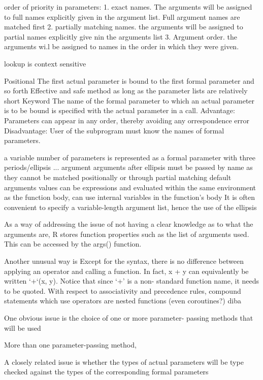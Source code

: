 \documentclass[12pt]{article}
\begin{document}
order of priority in parameters:
1. exact names. The arguments will be assigned to full names explicitly given in the argument list. Full argument names are matched first
2. partially matching names. the arguments will be assigned to partial names explicitly give nin the arguments list
3. Argument order. the arguments wi.l be assigned to names in the order in which they were given.

lookup is context sensitive

 Positional
 The first actual parameter is bound to the first formal parameter and
so forth
 Effective and safe method as long as the parameter lists are relatively
short
 Keyword
 The name of the formal parameter to which an actual parameter is to
be bound is specified with the actual parameter in a call.
 Advantage: Parameters can appear in any order, thereby avoiding any
orrespondence error
 Disadvantage: User of the subprogram must know the names of formal
parameters.


 a variable number of parameters is represented as a
formal parameter with three periods/ellipsis
... argument
arguments after ellipsis must be passed by name as they cannot be matched positionally or through partial matching
default arguments values can be expressions and evaluated within the same environment as the function body, can use internal variables in the function's body
It is often convenient to specify a variable-length argument list, hence the use of the ellipsis

As a way of addressing the issue of not having a clear knowledge as to what the arguments are, R stores function properties such as the list of arguments used. This can be accessed by the args() function.

Another unusual way is
Except for the syntax, there is no difference between applying an operator and calling a
function. In fact, x + y can equivalently be written ‘+‘(x, y). Notice that since ‘+’ is a non-
standard function name, it needs to be quoted. With respect to associativity and precedence rules, compound statements which use operators are nested functions (even coroutines?) diba

 One obvious issue is the choice of one or more parameter-
passing methods that will be used

More than one parameter-passing method,

 A closely related issue is whether the types of actual
parameters will be type checked against the types of the
corresponding formal parameters
\end{document}
